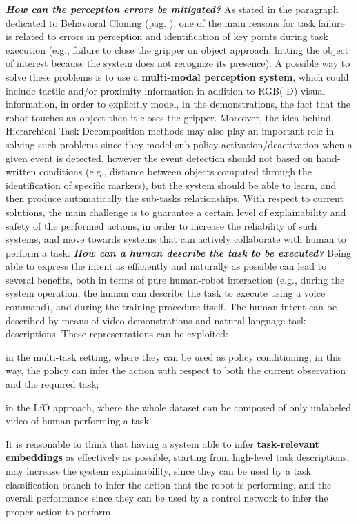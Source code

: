 \newline \textbf{\textit{How can the perception errors be mitigated?}} As stated in the paragraph dedicated to Behavioral Cloning (pag. \pageref{sec:lfo}), one of the main reasons for task failure is related to errors in perception and identification of key points during task execution (e.g., failure to close the gripper on object approach, hitting the object of interest because the system does not recognize its presence). A possible way to solve these problems is to use a \textbf{multi-modal perception system}, which could include tactile and/or proximity information in addition to RGB(-D) visual information, in order to explicitly model, in the demonstrations, the fact that the robot touches an object then it closes the gripper. Moreover, the idea behind Hierarchical Task Decomposition methods may also play an important role in solving such problems since they model sub-policy activation/deactivation when a given event is detected, however the event detection should not based on hand-written conditions (e.g., distance between objects computed through the identification of specific markers), but the system should be able to learn, and then produce automatically the sub-tasks relationships. With respect to current solutions, the main challenge is to guarantee a certain level of explainability and safety of the performed actions, in order to increase the reliability of such systems, and move towards systems that can actively collaborate with human to perform a task.
\newline \textbf{\textit{How can a human describe the task to be executed?}} Being able to express the intent as efficiently and naturally as possible can lead to several benefits, both in terms of pure human-robot interaction (e.g., during the system operation, the human can describe the task to execute using a voice command), and during the training procedure itself. The human intent can be described by means of video demonstrations and natural language task descriptions. These representations can be exploited: \begin{enumerate*}[label=\textbf{(\arabic*)}]
    \item in the multi-task setting, where they can be used as policy conditioning, in this way, the policy can infer the action with respect to both the current observation and the required task;
    \item in the LfO approach, where the whole dataset can be composed of only unlabeled video of human performing a task.
\end{enumerate*}
It is reasonable to think that having a system able to infer \textbf{task-relevant embeddings} as effectively as possible, starting from high-level task descriptions, may increase the system explainability, since they can be used by a task classification branch to infer the  action that the robot is performing, and the overall performance since they can be used by a control network to infer the proper action to perform.

